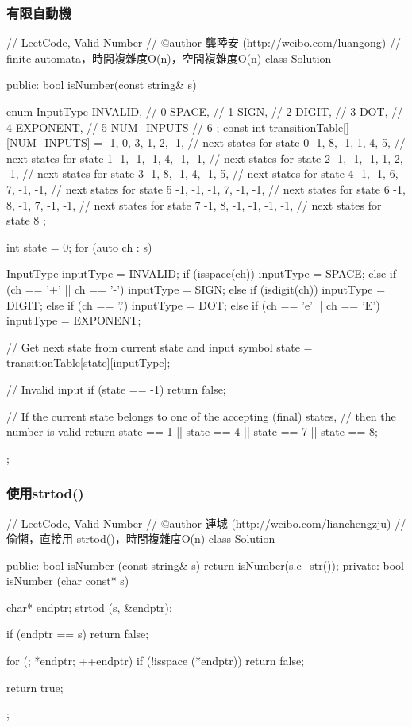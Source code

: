 \subsubsection{有限自動機}
\begin{Code}
// LeetCode, Valid Number
// @author 龔陸安 (http://weibo.com/luangong)
// finite automata，時間複雜度O(n)，空間複雜度O(n)
class Solution {
public:
    bool isNumber(const string& s) {
        enum InputType {
            INVALID,    // 0
            SPACE,      // 1
            SIGN,       // 2
            DIGIT,      // 3
            DOT,        // 4
            EXPONENT,   // 5
            NUM_INPUTS  // 6
        };
        const int transitionTable[][NUM_INPUTS] = {
                -1, 0, 3, 1, 2, -1, // next states for state 0
                -1, 8, -1, 1, 4, 5,     // next states for state 1
                -1, -1, -1, 4, -1, -1,     // next states for state 2
                -1, -1, -1, 1, 2, -1,     // next states for state 3
                -1, 8, -1, 4, -1, 5,     // next states for state 4
                -1, -1, 6, 7, -1, -1,     // next states for state 5
                -1, -1, -1, 7, -1, -1,     // next states for state 6
                -1, 8, -1, 7, -1, -1,     // next states for state 7
                -1, 8, -1, -1, -1, -1,     // next states for state 8
                };

        int state = 0;
        for (auto ch : s) {
            InputType inputType = INVALID;
            if (isspace(ch))
                inputType = SPACE;
            else if (ch == '+' || ch == '-')
                inputType = SIGN;
            else if (isdigit(ch))
                inputType = DIGIT;
            else if (ch == '.')
                inputType = DOT;
            else if (ch == 'e' || ch == 'E')
                inputType = EXPONENT;

            // Get next state from current state and input symbol
            state = transitionTable[state][inputType];

            // Invalid input
            if (state == -1) return false;
        }
        // If the current state belongs to one of the accepting (final) states,
        // then the number is valid
        return state == 1 || state == 4 || state == 7 || state == 8;

    }
};
\end{Code}


\subsubsection{使用strtod()}
\begin{Code}
// LeetCode, Valid Number
// @author 連城 (http://weibo.com/lianchengzju)
// 偷懶，直接用 strtod()，時間複雜度O(n)
class Solution {
public:
    bool isNumber (const string& s) {
        return isNumber(s.c_str());
    }
private:
    bool isNumber (char const* s) {
        char* endptr;
        strtod (s, &endptr);

        if (endptr == s) return false;

        for (; *endptr; ++endptr)
            if (!isspace (*endptr)) return false;

        return true;
    }
};
\end{Code}


